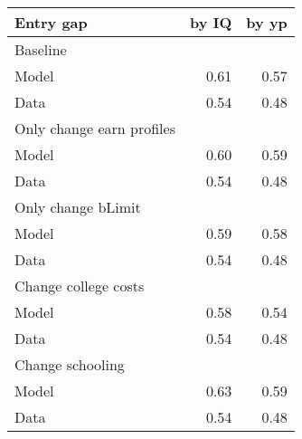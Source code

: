 \begin{tabular}{lrr}
\hline
Entry gap & by IQ  & by yp  \\ 
\hline
Baseline &   &   \\ 
Model & 0.61  & 0.57  \\ 
Data & 0.54  & 0.48  \\ 
Only change earn profiles &   &   \\ 
Model & 0.60  & 0.59  \\ 
Data & 0.54  & 0.48  \\ 
Only change bLimit &   &   \\ 
Model & 0.59  & 0.58  \\ 
Data & 0.54  & 0.48  \\ 
Change college costs &   &   \\ 
Model & 0.58  & 0.54  \\ 
Data & 0.54  & 0.48  \\ 
Change schooling &   &   \\ 
Model & 0.63  & 0.59  \\ 
Data & 0.54  & 0.48  \\ 
\hline
\end{tabular}%
